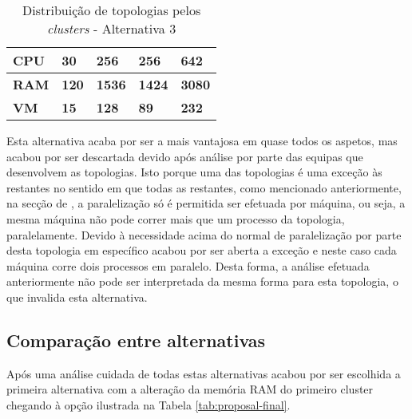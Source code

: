 \begin{table}[H]
\begin{tabular}{|l|l|l|l|l|}
    \rowcolor[HTML]{D9D9D9} 
    \textbf{CPU} & \textbf{30} & \textbf{256} & \textbf{256} & \textbf{642} \\ \hline
    \rowcolor[HTML]{D9D9D9} 
    \textbf{RAM} & \textbf{120} & \textbf{1536} & \textbf{1424} & \textbf{3080} \\ \hline
    \rowcolor[HTML]{D9D9D9} 
    \textbf{VM} & \textbf{15} & \textbf{128} & \textbf{89} & \textbf{232} \\ \hline
  \end{tabular}
  \caption{Distribuição de topologias pelos \textit{clusters} - Alternativa 3}
  \label{tab:proposal-3}
\end{table}

Esta alternativa acaba por ser a mais vantajosa em quase todos os aspetos, mas acabou por ser 
descartada devido após análise por parte das equipas que desenvolvem as topologias. Isto porque uma 
das topologias é uma exceção às restantes no sentido em que todas as restantes, como mencionado 
anteriormente, na secção de , a paralelização só é permitida ser 
efetuada por máquina, ou seja, a mesma máquina não pode correr mais que um processo da topologia, 
paralelamente. Devido à necessidade acima do normal de paralelização por parte desta topologia em 
específico acabou por ser aberta a exceção e neste caso cada máquina corre dois processos em 
paralelo. Desta forma, a análise efetuada anteriormente não pode ser interpretada da mesma forma 
para esta topologia, o que invalida esta alternativa.

\subsection{Comparação entre alternativas}

Após uma análise cuidada de todas estas alternativas acabou por ser escolhida a primeira alternativa
com a alteração da memória RAM do primeiro \gls{cluster} chegando à opção ilustrada na Tabela
\ref{tab:proposal-final}.

